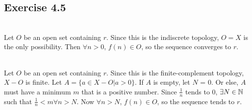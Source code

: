 \subsection{Exercise 4.5}
\setcounter{question}{0}


\begin{solution}
 \\Let $O$ be an open set containing $r$. Since this is the indiscrete topology, $O=X$ is the only possibility. Then $\forall n > 0$, $f(n) \in O$, so the sequence converges to $r$.
\end{solution}


\begin{solution}
 \\Let $O$ be an open set containing $r$. Since this is the finite-complement topology, $X-O$ is finite. Let $A = \{a \in X-O|a > 0\}$. If $A$ is empty, let $N$ = 0. Or else, $A$ must have a minimum $m$ that is a positive number. Since $\frac{1}{n}$ tends to 0, $\exists N \in \mathbb{N}$ such that $\frac{1}{n} < m \forall n > N$. Now $\forall n > N$, $f(n) \in O$, so the sequence tends to $r$.
\end{solution}


